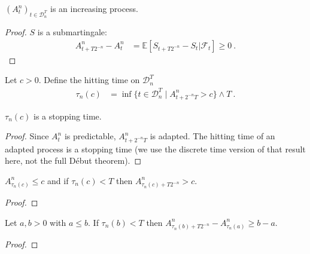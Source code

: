 \begin{lemma}\label{lem:Predict_Part_Increasing}
  $(A^n_t)_{t\in\mathcal{D}_n^T}$ is an increasing process.
\end{lemma}

\begin{proof}
$S$ is a submartingale:
\begin{align*}
  A^n_{t+T2^{-n}} - A^n_t
  &= \mathbb{E}\left[ S_{t+T2^{-n}}-S_t|\mathcal{F}_t\right] \ge 0
  \: .
\end{align*}
\end{proof}


\begin{definition}\label{def:hittingAGT}
Let $c>0$. Define the hitting time on $\mathcal{D}^T_n$
\begin{align*}
  \tau_n(c)
  &= \inf\{t \in \mathcal{D}^T_n \mid A^n_{t + 2^{-n}T} > c\} \wedge T
  \: .
\end{align*}
\end{definition}


\begin{lemma}\label{lem:IsStoppingTime_hittingAGT}
  $\tau_n(c)$ is a stopping time.
\end{lemma}

\begin{proof}
Since $A^n_{t}$ is predictable, $A^n_{t + 2^{-n}T}$ is adapted.
The hitting time of an adapted process is a stopping time (we use the discrete time version of that result here, not the full Début theorem).
\end{proof}


\begin{lemma}\label{lem:A_hittingAGT_le}
$A^n_{\tau_n(c)} \le c$ and if $\tau_n(c) < T$ then $A^n_{\tau_n(c)+T2^{-n}} > c$.
\end{lemma}

\begin{proof}

\end{proof}


\begin{lemma}\label{lem:A_hittingAGT_sub_ge}
Let $a, b > 0$ with $a \le b$. If $\tau_n(b) < T$ then $A^n_{\tau_n(b)+T2^{-n}} - A^n_{\tau_n(a)} \ge b - a$.
\end{lemma}

\begin{proof}

\end{proof}


